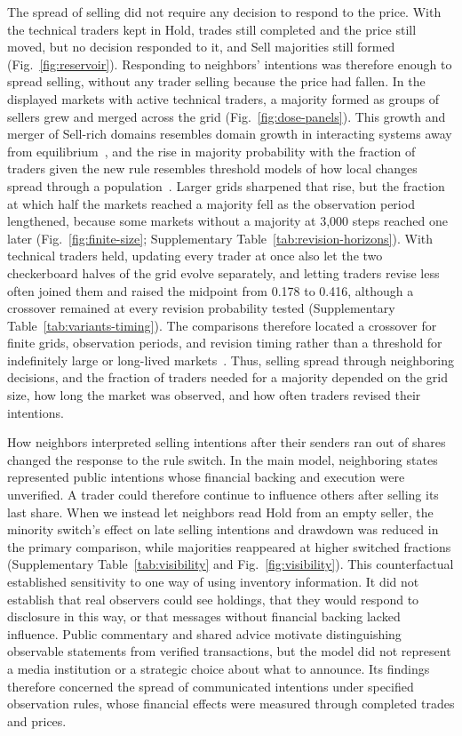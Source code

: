 The spread of selling did not require any decision to respond to the
price. With the technical traders kept in Hold, trades still completed and the
price still moved, but no decision responded to it, and Sell majorities
still formed (Fig.~\ref{fig:reservoir}). Responding to neighbors'
intentions was therefore enough to spread selling, without any trader
selling because the price had fallen.
In the displayed markets with active technical traders, a
majority formed as groups of sellers grew and merged across the grid
(Fig.~\ref{fig:dose-panels}). This growth and merger of Sell-rich
domains resembles domain growth in interacting systems away from
equilibrium~\cite{hinrichsen2000nonequilibrium,bray1994theory}, and the
rise in majority probability with the fraction of traders given the new
rule resembles threshold models of how local changes spread through a
population~\cite{granovetter1978threshold,watts2002simple,aizenman1988metastability,holroyd2003sharp}.
Larger grids sharpened that rise, but the fraction at which half the
markets reached a majority fell as the observation period lengthened,
because some markets without a majority at 3,000 steps reached one later
(Fig.~\ref{fig:finite-size}; Supplementary
Table~\ref{tab:revision-horizons}). With technical traders held,
updating every trader at once also let the two checkerboard halves of
the grid evolve separately, and
letting traders revise less often joined them and raised the midpoint
from 0.178 to 0.416, although a crossover remained at every revision
probability tested (Supplementary Table~\ref{tab:variants-timing}). The
comparisons therefore located a crossover for finite grids, observation
periods, and revision timing rather than a threshold for indefinitely
large or long-lived markets~\cite{binder1981finite,landau2021guide}.
Thus, selling spread through neighboring decisions, and the fraction of
traders needed for a majority depended on the grid size, how long the
market was observed, and how often traders revised their intentions.

How neighbors interpreted selling intentions after their senders ran out
of shares changed the response to the rule switch. In the main
model, neighboring states represented public intentions whose financial
backing and execution were unverified. A trader could therefore continue
to influence others after selling its last share. When we instead let
neighbors read Hold from an empty seller, the minority switch's effect
on late selling intentions and drawdown was reduced in the primary
comparison, while majorities reappeared at higher switched fractions
(Supplementary Table~\ref{tab:visibility} and
Fig.~\ref{fig:visibility}). This counterfactual established sensitivity
to one way of using inventory information. It did not establish that
real observers could see holdings, that they would respond to disclosure
in this way, or that messages without financial backing lacked
influence. Public commentary and shared advice motivate distinguishing
observable statements from verified transactions, but the model did not
represent a media institution or a strategic choice about what to
announce. Its findings therefore concerned the spread of communicated
intentions under specified observation rules, whose financial effects
were measured through completed trades and prices.

